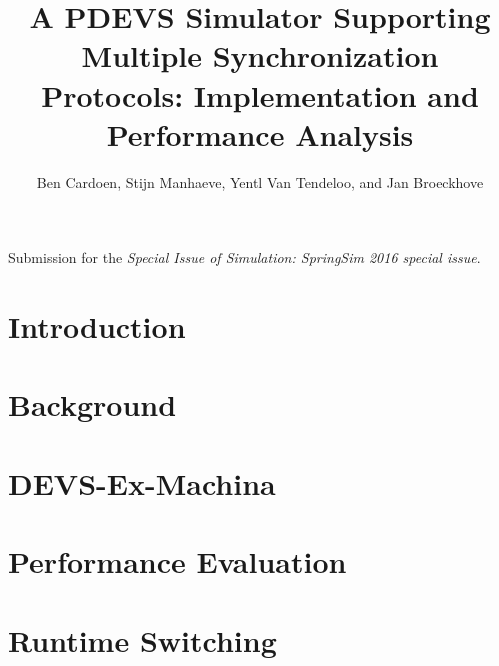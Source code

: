 \documentclass[twocolumn]{sagej}
\begin{document}
\title{A PDEVS Simulator Supporting Multiple Synchronization Protocols: Implementation and Performance Analysis}

\author{Ben Cardoen, Stijn Manhaeve, Yentl Van Tendeloo, and Jan Broeckhove}




\begin{abstract}

\end{abstract}

\maketitle
\begin{center}
Submission for the \textit{Special Issue of Simulation: SpringSim 2016 special issue}.
\end{center}

\section{Introduction}
\label{sec:1-introduction}


\section{Background}
\label{sec:2-background}


\section{DEVS-Ex-Machina}
\label{sec:3-features}


\section{Performance Evaluation}
\label{sec:4-performance}


\section{Runtime Switching}
\label{sec:4b-hotswap}

\end{document}

